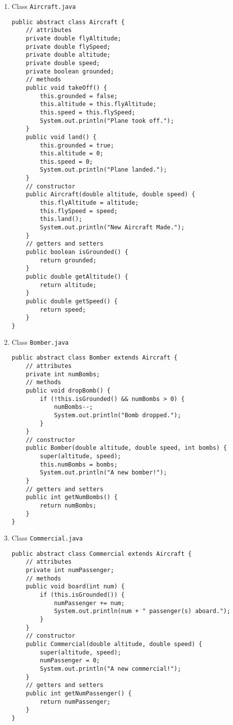 \documentclass[12pt,letterpaper,twoside]{article}
\begin{document}
\begin{enumerate}
\item Class \texttt{Aircraft.java}

\lstset{language=java,tabsize=2}
\begin{lstlisting}
public abstract class Aircraft {
	// attributes
	private double flyAltitude;
	private double flySpeed;
	private double altitude;
	private double speed;
	private boolean grounded;
	// methods
	public void takeOff() {
		this.grounded = false;
		this.altitude = this.flyAltitude;
		this.speed = this.flySpeed;
		System.out.println("Plane took off.");
	}
	public void land() {
		this.grounded = true;
		this.altitude = 0;
		this.speed = 0;
		System.out.println("Plane landed.");
	}
	// constructor
	public Aircraft(double altitude, double speed) {
		this.flyAltitude = altitude;
		this.flySpeed = speed;
		this.land();
		System.out.println("New Aircraft Made.");
	}
	// getters and setters
	public boolean isGrounded() {
		return grounded;
	}
	public double getAltitude() {
		return altitude;
	}
	public double getSpeed() {
		return speed;
	}
}
\end{lstlisting}

\item Class \texttt{Bomber.java}

\lstset{language=java,tabsize=2}
\begin{lstlisting}
public abstract class Bomber extends Aircraft {
	// attributes
	private int numBombs;
	// methods
	public void dropBomb() {
		if (!this.isGrounded() && numBombs > 0) {
			numBombs--;
			System.out.println("Bomb dropped.");
		}
	}
	// constructor
	public Bomber(double altitude, double speed, int bombs) {
		super(altitude, speed);
		this.numBombs = bombs;
		System.out.println("A new bomber!");
	}
	// getters and setters
	public int getNumBombs() {
		return numBombs;
	}
}
\end{lstlisting}

\item Class \texttt{Commercial.java}

\lstset{language=java,tabsize=2}
\begin{lstlisting}
public abstract class Commercial extends Aircraft {
	// attributes
	private int numPassenger;
	// methods
	public void board(int num) {
		if (this.isGrounded()) {
			numPassenger += num;
			System.out.println(num + " passenger(s) aboard.");
		}
	}
	// constructor
	public Commercial(double altitude, double speed) {
		super(altitude, speed);
		numPassenger = 0;
		System.out.println("A new commercial!");
	}
	// getters and setters
	public int getNumPassenger() {
		return numPassenger;
	}
}
\end{lstlisting}


\end{enumerate}
\end{document}
